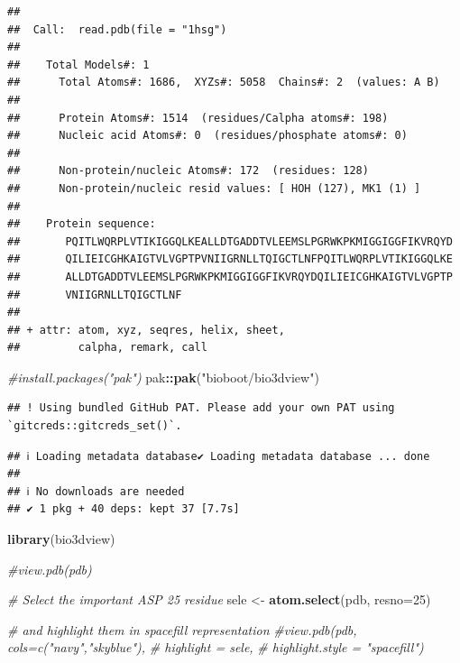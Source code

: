 \documentclass[
]{article}
\newenvironment{Shaded}{\begin{snugshade}}{\end{snugshade}}
\newcommand{\AttributeTok}[1]{\textcolor[rgb]{0.13,0.29,0.53}{#1}}
\newcommand{\CommentTok}[1]{\textcolor[rgb]{0.56,0.35,0.01}{\textit{#1}}}
\newcommand{\DecValTok}[1]{\textcolor[rgb]{0.00,0.00,0.81}{#1}}
\newcommand{\FunctionTok}[1]{\textcolor[rgb]{0.13,0.29,0.53}{\textbf{#1}}}
\newcommand{\NormalTok}[1]{#1}
\newcommand{\OtherTok}[1]{\textcolor[rgb]{0.56,0.35,0.01}{#1}}
\newcommand{\SpecialCharTok}[1]{\textcolor[rgb]{0.81,0.36,0.00}{\textbf{#1}}}
\newcommand{\StringTok}[1]{\textcolor[rgb]{0.31,0.60,0.02}{#1}}
\begin{document}
\begin{verbatim}
## 
##  Call:  read.pdb(file = "1hsg")
## 
##    Total Models#: 1
##      Total Atoms#: 1686,  XYZs#: 5058  Chains#: 2  (values: A B)
## 
##      Protein Atoms#: 1514  (residues/Calpha atoms#: 198)
##      Nucleic acid Atoms#: 0  (residues/phosphate atoms#: 0)
## 
##      Non-protein/nucleic Atoms#: 172  (residues: 128)
##      Non-protein/nucleic resid values: [ HOH (127), MK1 (1) ]
## 
##    Protein sequence:
##       PQITLWQRPLVTIKIGGQLKEALLDTGADDTVLEEMSLPGRWKPKMIGGIGGFIKVRQYD
##       QILIEICGHKAIGTVLVGPTPVNIIGRNLLTQIGCTLNFPQITLWQRPLVTIKIGGQLKE
##       ALLDTGADDTVLEEMSLPGRWKPKMIGGIGGFIKVRQYDQILIEICGHKAIGTVLVGPTP
##       VNIIGRNLLTQIGCTLNF
## 
## + attr: atom, xyz, seqres, helix, sheet,
##         calpha, remark, call
\end{verbatim}

\begin{Shaded}
\end{Shaded}

\begin{Shaded}
\begin{Highlighting}[]
\CommentTok{\#install.packages("pak")}
\NormalTok{pak}\SpecialCharTok{::}\FunctionTok{pak}\NormalTok{(}\StringTok{"bioboot/bio3dview"}\NormalTok{)}
\end{Highlighting}
\end{Shaded}

\begin{verbatim}
## ! Using bundled GitHub PAT. Please add your own PAT using `gitcreds::gitcreds_set()`.
\end{verbatim}

\begin{verbatim}
## ℹ Loading metadata database✔ Loading metadata database ... done
##  
## ℹ No downloads are needed
## ✔ 1 pkg + 40 deps: kept 37 [7.7s]
\end{verbatim}

\begin{Shaded}
\begin{Highlighting}[]
\FunctionTok{library}\NormalTok{(bio3dview)}

\CommentTok{\#view.pdb(pdb)}
\end{Highlighting}
\end{Shaded}

\begin{Shaded}
\begin{Highlighting}[]
\CommentTok{\# Select the important ASP 25 residue}
\NormalTok{sele }\OtherTok{\textless{}{-}} \FunctionTok{atom.select}\NormalTok{(pdb, }\AttributeTok{resno=}\DecValTok{25}\NormalTok{)}

\CommentTok{\# and highlight them in spacefill representation}
\CommentTok{\#view.pdb(pdb, cols=c("navy","skyblue"), }
        \CommentTok{\# highlight = sele,}
        \CommentTok{\# highlight.style = "spacefill")}
\end{Highlighting}
\end{Shaded}
\end{document}
